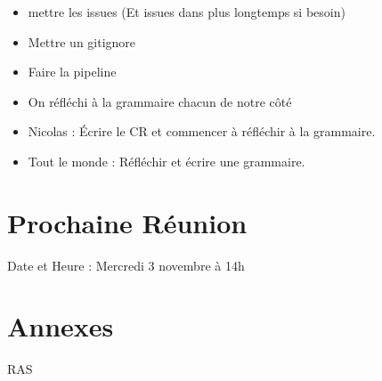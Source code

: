 \documentclass[french]{article}
\begin{document}
\begin{itemize}
    \item mettre les issues (Et issues dans plus longtemps si besoin)
    \item Mettre un gitignore
    \item Faire la pipeline
    \item On réfléchi à la grammaire chacun de notre côté
\end{itemize}

\begin{itemize}
    \item Nicolas : Écrire le CR et commencer à réfléchir à la grammaire.
    \item Tout le monde : Réfléchir et écrire une grammaire.
\end{itemize}


\section*{Prochaine Réunion}

Date et Heure : Mercredi 3 novembre à 14h

\section*{Annexes}
RAS
\end{document}
